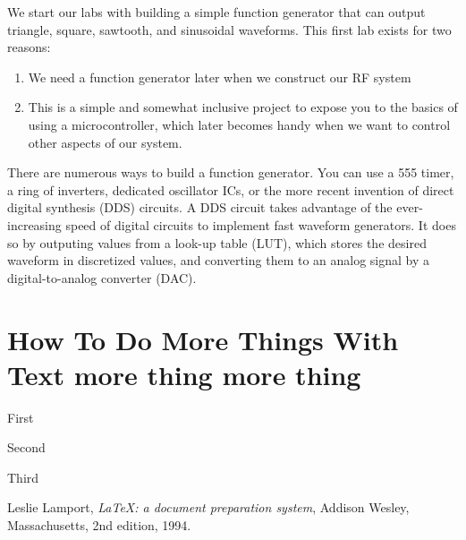 \documentclass[letterpaper, 11pt]{article}
\begin{document}
We start our labs with building a simple function generator that can output triangle, square, sawtooth, and sinusoidal waveforms. This first lab exists for two reasons:
\begin{enumerate}
	\item We need a function generator later when we construct our RF system
	\item This is a simple and somewhat inclusive project to expose you to the basics of using a microcontroller, which later becomes handy when we want to control other aspects of our system. 
\end{enumerate}

There are numerous ways to build a function generator. You can use a 555 timer, a ring of inverters, dedicated oscillator ICs, or the more recent invention of direct digital synthesis (DDS) circuits. A DDS circuit takes advantage of the ever-increasing speed of digital circuits to implement fast waveform generators. It does so by outputing values from a look-up table (LUT), which stores the desired waveform in discretized values, and converting them to an analog signal by a digital-to-analog converter (DAC). 


\reversemarginpar
{}

  \kant[2]

\section{How To Do More Things With Text more thing more thing}
  \kant[2]
  \begin{steps}
    \item First
    \item Second
    \item Third
  \end{steps}

\begin{thebibliography}{9}

  Leslie Lamport,
  \emph{\LaTeX: a document preparation system},
  Addison Wesley, Massachusetts,
  2nd edition,
  1994.

\end{thebibliography}
\end{document}
